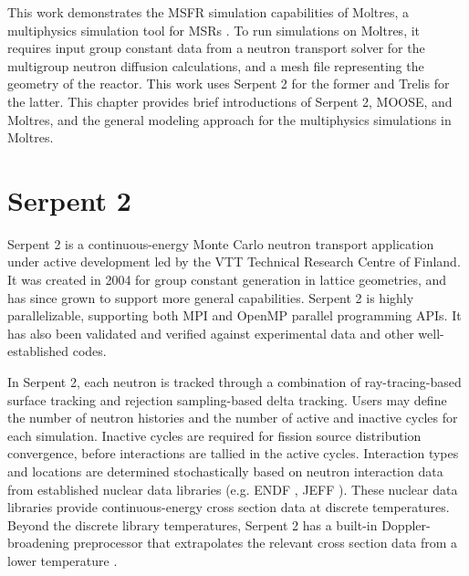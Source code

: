 This work demonstrates the \gls{MSFR} simulation capabilities of Moltres, a
multiphysics simulation tool for \glspl{MSR} \cite{lindsay_introduction_2018}.
To run simulations on Moltres, it requires input
group constant data from a neutron transport solver for the
multigroup neutron diffusion calculations, and a mesh file representing the
geometry of the reactor. This work uses Serpent 2 \cite{leppanen_serpent_2014}
for the former and Trelis \cite{noauthor_trelis_2018} for the latter.
This chapter provides brief introductions of
Serpent 2, MOOSE, and Moltres, and the general modeling approach for the
multiphysics simulations in Moltres.

\section{Serpent 2}

Serpent 2 \cite{leppanen_serpent_2014} is a continuous-energy Monte Carlo
neutron transport application under
active development led by the VTT Technical Research Centre of Finland. It was
created in 2004 for group constant generation in lattice geometries, and has
since grown to support more general capabilities. Serpent 2 is highly
parallelizable, supporting
both MPI and OpenMP parallel programming APIs. It has also been validated and
verified against experimental data and other well-established codes.

In Serpent 2, each neutron is tracked through a combination of
ray-tracing-based surface tracking and rejection sampling-based delta
tracking. Users may define the number of neutron histories and the number of
active and inactive cycles for each
simulation. Inactive cycles are required for fission source distribution
convergence, before interactions are tallied in the active cycles.
Interaction types and locations are
determined stochastically based on neutron interaction data from established
nuclear data libraries (e.g. ENDF \cite{chadwick_endf/b-vii.1_2011}, JEFF
\cite{oecd/nea_jeff-3.1.2_2014}). These nuclear data libraries provide
continuous-energy cross section data at discrete temperatures. Beyond the
discrete library temperatures, Serpent 2 has a built-in Doppler-broadening
preprocessor that extrapolates the relevant cross section data from a lower
temperature \cite{leppanen_serpent_2014}. 

